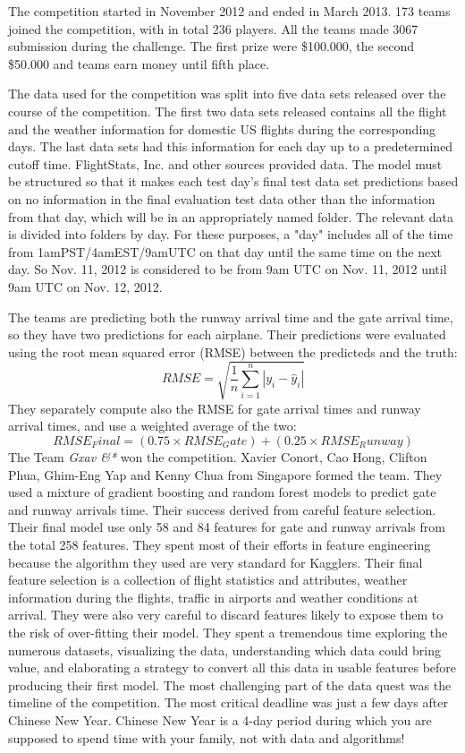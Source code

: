 \documentclass{vldb}
\begin{document}
	The competition started in November 2012 and ended in March 2013. 173 teams joined the competition, with in total 236 players. All the teams made 3067 submission during the challenge. The first prize were \$100.000, the second \$50.000 and teams earn money until fifth place.

	The data used for the competition was split into five data sets released over the course of the competition.
	The first two data sets released contains all the flight and the weather information for domestic US flights during the corresponding days.
	The last data sets had this information for each day up to a predetermined cutoff time.
	FlightStats, Inc. and other sources provided data.
	The model must be structured so that it makes each test day's final test data set predictions based on no information in the final evaluation test data other than the information from that day, which will be in an appropriately named folder.
	The relevant data is divided into folders by day.
	For these purposes, a "day" includes all of the time from 1amPST/4amEST/9amUTC on that day until the same time on the next day.
	So Nov. 11, 2012 is considered to be from 9am UTC on Nov. 11, 2012 until 9am UTC on Nov. 12, 2012.

	The teams are predicting both the runway arrival time and the gate arrival time, so they have two predictions for each airplane.
	Their predictions were evaluated using the root mean squared error (RMSE) between the predicteds and the truth:
		$$RMSE=\sqrt{\frac{1}{n}\sum_{i=1}^n \left | y_i - \hat{y}_i \right |} $$
	They separately compute also the RMSE for gate arrival times and runway arrival times, and use a weighted average of the two:
		$$RMSE_Final=(0.75×RMSE_Gate)+(0.25×RMSE_Runway)$$
	The Team \textit{Gxav \&*} won the competition.
	Xavier Conort, Cao Hong, Clifton Phua, Ghim-Eng Yap and Kenny Chua from Singapore formed the team.
	They used a mixture of gradient boosting and random forest models to predict gate and runway arrivals time.
	Their success derived from careful feature selection.
	Their final model use only 58 and 84 features for gate and runway arrivals from the total 258 features.
	They spent most of their efforts in feature engineering because the algorithm they used are very standard for Kagglers.
	Their final feature selection is a collection of flight statistics and attributes, weather information during the flights, traffic in airports and weather conditions at arrival.
	They were also very careful to discard features likely to expose them to the risk of over-fitting their model. 
	They spent a tremendous time exploring the numerous datasets, visualizing the data, understanding which data could bring value, and elaborating a strategy to convert all this data in usable features before producing their first model. 
	The most challenging part of the data quest was the timeline of the competition. 
	The most critical deadline was just a few days after Chinese New Year.
	Chinese New Year is a 4-day period during which you are supposed to spend time with your family, not with data and algorithms!
\end{document}
